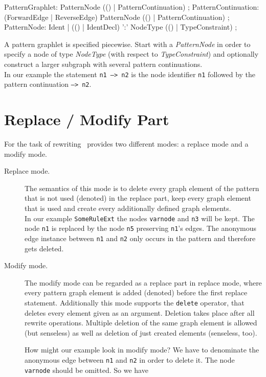 \begin{rail}   
  PatternGraphlet: PatternNode (() | PatternContinuation) ;
  PatternContinuation: (ForwardEdge | ReverseEdge) PatternNode (() | PatternContinuation) ;
  PatternNode: Ident | 
    (() | IdentDecl) ':' NodeType (() | TypeConstraint) ; 
\end{rail}
A pattern graphlet is specified piecewise. Start with a \emph{PatternNode} in order to specify a node of type \emph{NodeType} (with respect to \emph{TypeConstraint}) and optionally construct a larger subgraph with several pattern continuations. \\
In our example the statement \texttt{n1 --> n2} is the node identifier \texttt{n1} followed by the pattern continuation \texttt{--> n2}.

\section{Replace / Modify Part}
\label{replacepart}
For the task of rewriting \GrG\ provides two different modes: a replace mode and a modify mode.
\begin{description}
  \item[Replace mode.] The semantics of this mode is to delete every graph element of the pattern that is not used (denoted) in the replace part, keep every graph element that is used and create every additionally defined graph elements.\\
  In our example \texttt{SomeRuleExt} the nodes \texttt{varnode} and \texttt{n3} will be kept. The node \texttt{n1} is replaced by the node \texttt{n5} preserving \texttt{n1}'s edges. The anonymous edge instance between \texttt{n1} and \texttt{n2} only occurs in the pattern and therefore gets deleted.
  \item[Modify mode.] The modify mode can be regarded as a replace part in replace mode, where every pattern graph element is added (denoted) before the first replace statement. Additionally this mode supports the \texttt{delete} operator, that deletes every element given as an argument. Deletion takes place after all rewrite operations. Multiple deletion of the same graph element is allowed (but senseless) as well as deletion of just created elements (senseless, too).
\begin{example}
How might our example look in modify mode? We have to denominate the anonymous edge between \texttt{n1} and \texttt{n2} in order to delete it. The node \texttt{varnode} should be omitted. So we have
\begin{grgen}
rule SomeRuleExtMod(varnode: Node): (Node, EdgeTypeB) {
  pattern {
    ...
    n1 -e0:Edge-> n2;
    ...
  }
  modify {
    n5 : NodeTypeC<n1>;
    n3 -e1:EdgeTypeB-> n5;
    delete(e0);
    eval {
      ...
\end{grgen}
\end{example}
\end{description}

